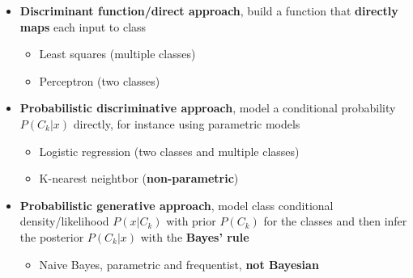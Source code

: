     \begin{itemize}
        \item \textbf{Discriminant function/direct approach}, build a function that \textbf{directly maps} each input to class
        \begin{itemize}
            \item Least squares (multiple classes)
            \item Perceptron (two classes)
        \end{itemize}
        \item \textbf{Probabilistic discriminative approach}, model a conditional probability $P(C_k|x)$ directly, for instance using parametric models
        \begin{itemize}
            \item Logistic regression (two classes and multiple classes)
            \item K-nearest neightbor (\textbf{non-parametric})
        \end{itemize}
        \item \textbf{Probabilistic generative approach}, model class conditional density/likelihood $P(x|C_k)$ with prior $P(C_k)$ for the classes and then infer the posterior $P(C_k|x)$ with the \textbf{Bayes' rule}
        \begin{itemize}
            \item Naive Bayes, parametric and frequentist, \textbf{not Bayesian}
        \end{itemize}
    \end{itemize}

